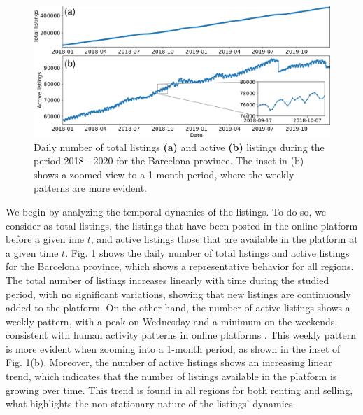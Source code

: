 \begin{figure}
    \vspace{0.2 cm}
    \centering
    \includegraphics[width =\textwidth]{Figs/Idealista_dynamics/adds_evo.pdf}
	\caption[Active listings evolution.]{\label{fig:active_adds} Daily number of total listings \textbf{(a)} and active \textbf{(b)} listings during the period 2018 - 2020 for the Barcelona province. The inset in (b) shows a zoomed view to a 1 month period, where the weekly patterns are more evident.}
\end{figure}

We begin by analyzing the temporal dynamics of the listings. To do so, we consider as total listings, the listings that have been posted in the online platform before a given ime $t$, and active listings those that are available in the platform at a given time $t$. Fig. \ref{fig:active_adds} shows the daily number of total listings and active listings for the Barcelona province, which shows a representative behavior for all regions. The total number of listings increases linearly with time during the studied period, with no significant variations, showing that new listings are continuously added to the platform. On the other hand, the number of active listings shows a weekly pattern, with a peak on Wednesday and a minimum on the weekends, consistent with human activity patterns in online platforms \cite{szell2010multirelational}. This weekly pattern is more evident when zooming into a 1-month period, as shown in the inset of Fig. \ref{fig:active_adds}(b). Moreover, the number of active listings shows an increasing linear trend, which indicates that the number of listings available in the platform is growing over time. This trend is found in all regions for both renting and selling, what highlights the non-stationary nature of the listings' dynamics.


